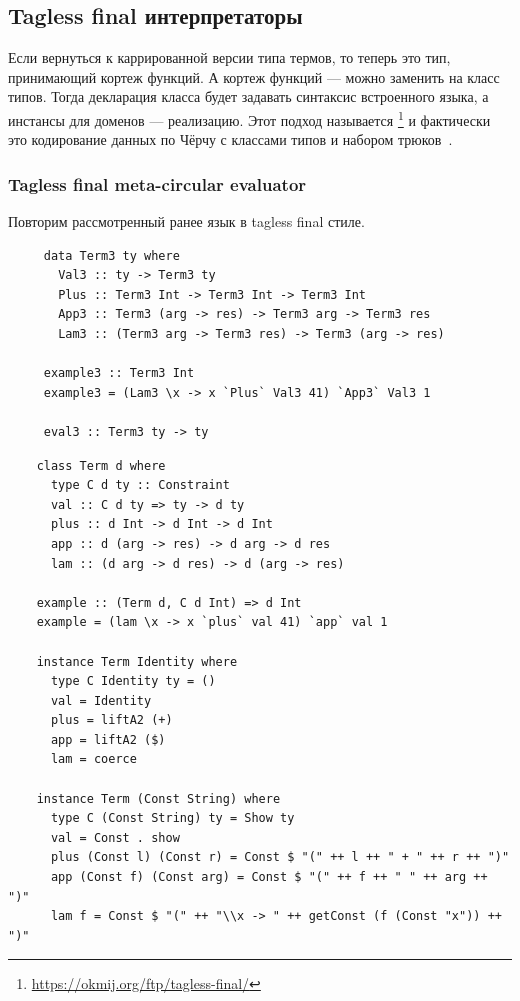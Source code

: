 
\subsection{Tagless final интерпретаторы}

Если вернуться к каррированной версии типа термов, то теперь это тип, принимающий кортеж функций.
А кортеж функций --- можно заменить на класс типов.
Тогда декларация класса будет задавать синтаксис встроенного языка, а инстансы для доменов --- реализацию.
Этот подход называется \footnote{\url{https://okmij.org/ftp/tagless-final/}} и фактически это кодирование данных по Чёрчу с классами типов и набором трюков~\cite{carette2007finally, kiselyov2012typed}.

\subsubsection{Tagless final meta-circular evaluator}

Повторим рассмотренный ранее язык в tagless final стиле.

\begin{verbatim}
     data Term3 ty where
       Val3 :: ty -> Term3 ty
       Plus :: Term3 Int -> Term3 Int -> Term3 Int
       App3 :: Term3 (arg -> res) -> Term3 arg -> Term3 res
       Lam3 :: (Term3 arg -> Term3 res) -> Term3 (arg -> res)

     example3 :: Term3 Int
     example3 = (Lam3 \x -> x `Plus` Val3 41) `App3` Val3 1

     eval3 :: Term3 ty -> ty
\end{verbatim}

\begin{verbatim}
    class Term d where
      type C d ty :: Constraint
      val :: C d ty => ty -> d ty
      plus :: d Int -> d Int -> d Int
      app :: d (arg -> res) -> d arg -> d res
      lam :: (d arg -> d res) -> d (arg -> res)

    example :: (Term d, C d Int) => d Int
    example = (lam \x -> x `plus` val 41) `app` val 1

    instance Term Identity where
      type C Identity ty = ()
      val = Identity
      plus = liftA2 (+)
      app = liftA2 ($)
      lam = coerce

    instance Term (Const String) where
      type C (Const String) ty = Show ty
      val = Const . show
      plus (Const l) (Const r) = Const $ "(" ++ l ++ " + " ++ r ++ ")"
      app (Const f) (Const arg) = Const $ "(" ++ f ++ " " ++ arg ++ ")"
      lam f = Const $ "(" ++ "\\x -> " ++ getConst (f (Const "x")) ++ ")"
\end{verbatim}


